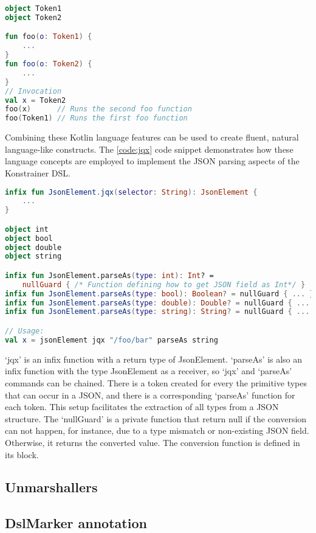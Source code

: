 \begin{lstlisting}[caption={Pattern matching},language=Kotlin,label=code:patternobj]
object Token1
object Token2

fun foo(o: Token1) {
    ...
}
fun foo(o: Token2) {
    ...
}
// Invocation
val x = Token2
foo(x)      // Runs the second foo function
foo(Token1) // Runs the first foo function
\end{lstlisting}

Combining these Kotlin language features can be used to create fluent, natural language-like constructs. The \ref{code:jqx} code snippet demonstrates how these language concepts are employed to implement the JSON parsing aspects of the Konstrainer DSL.

\begin{lstlisting}[caption={jqx implementation},language=Kotlin,label=code:jqx]
infix fun JsonElement.jqx(selector: String): JsonElement {
    ...
}

object int
object bool
object double
object string

infix fun JsonElement.parseAs(type: int): Int? = 
    nullGuard { /* Function defining how to get JSON field as Int*/ }
infix fun JsonElement.parseAs(type: bool): Boolean? = nullGuard { ... }
infix fun JsonElement.parseAs(type: double): Double? = nullGuard { ... }
infix fun JsonElement.parseAs(type: string): String? = nullGuard { ... }

// Usage:
val x = jsonElement jqx "/foo/bar" parseAs string
\end{lstlisting}

`jqx' is an infix function with a return type of JsonElement. `parseAs' is also an infix function with the type JsonElement as a receiver, so `jqx' and `parseAs' commands can be chained. There is a token created for every the primitive types that can occur in a JSON, and there is a corresponding `parseAs' function for each token. This setup facilitates the extraction of all types from a JSON structure. The `nullGuard' is a private function that return null if the conversion can not happen, for instance, due to a type mismatch or non-existing JSON field. Otherwise, it returns the converted value. The conversion function is defined in its block.


\subsection{Unmarshallers}

\subsection{DslMarker annotation}

